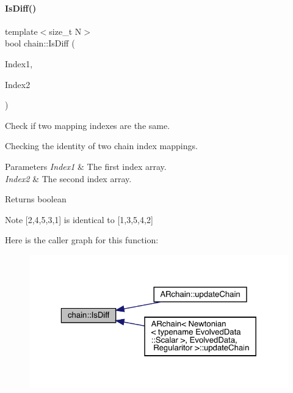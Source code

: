 \paragraph{\texorpdfstring{Is\+Diff()}{IsDiff()}}
{\footnotesize\ttfamily template$<$size\+\_\+t N$>$ \\
bool chain\+::\+Is\+Diff (\begin{DoxyParamCaption}\item[{const \mbox{\hyperlink{namespacechain_aa40d2da395c0ac2bc5f37832442ac403}{Index\+Array}}$<$ N $>$ \&}]{Index1,  }\item[{const \mbox{\hyperlink{namespacechain_aa40d2da395c0ac2bc5f37832442ac403}{Index\+Array}}$<$ N $>$ \&}]{Index2 }\end{DoxyParamCaption})}



Check if two mapping indexes are the same. 

Checking the identity of two chain index mappings. 
\begin{DoxyParams}{Parameters}
{\em Index1} & The first index array. \\
\hline
{\em Index2} & The second index array. \\
\hline
\end{DoxyParams}
\begin{DoxyReturn}{Returns}
boolean 
\end{DoxyReturn}
\begin{DoxyNote}{Note}
\mbox{[}2,4,5,3,1\mbox{]} is identical to \mbox{[}1,3,5,4,2\mbox{]} 
\end{DoxyNote}
Here is the caller graph for this function\+:\nopagebreak
\begin{figure}[H]
\begin{center}
\leavevmode
\includegraphics[width=323pt]{namespacechain_a874f28a6248b56c6b2b3ca45c1bbea09_icgraph}
\end{center}
\end{figure}
\mbox{\label{namespacechain_ae85619534182ce257fc47857a9c133e4}} 
